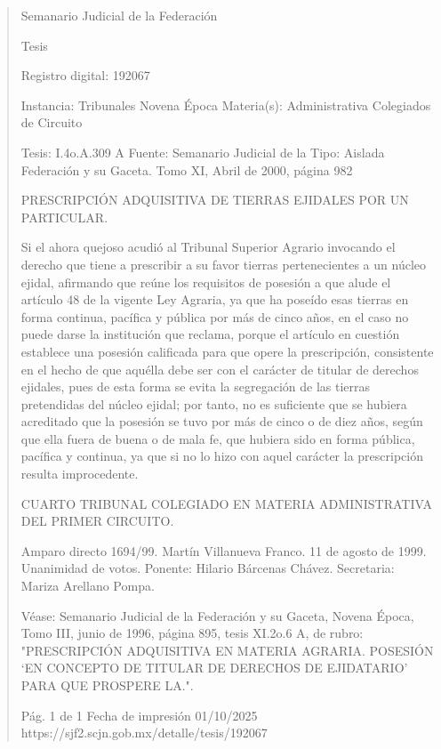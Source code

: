 \documentclass[11pt,a4paper]{article}
\begin{document}
\begin{quote}
                                                   Semanario Judicial de la Federación

                                                  Tesis

 Registro digital: 192067

 Instancia: Tribunales            Novena Época                          Materia(s): Administrativa
 Colegiados de Circuito

 Tesis: I.4o.A.309 A              Fuente: Semanario Judicial de la   Tipo: Aislada
                                  Federación y su Gaceta.
                                  Tomo XI, Abril de 2000, página 982


PRESCRIPCIÓN ADQUISITIVA DE TIERRAS EJIDALES POR UN PARTICULAR.


Si el ahora quejoso acudió al Tribunal Superior Agrario invocando el derecho que tiene a prescribir a
su favor tierras pertenecientes a un núcleo ejidal, afirmando que reúne los requisitos de posesión a
que alude el artículo 48 de la vigente Ley Agraria, ya que ha poseído esas tierras en forma continua,
pacífica y pública por más de cinco años, en el caso no puede darse la institución que reclama,
porque el artículo en cuestión establece una posesión calificada para que opere la prescripción,
consistente en el hecho de que aquélla debe ser con el carácter de titular de derechos ejidales,
pues de esta forma se evita la segregación de las tierras pretendidas del núcleo ejidal; por tanto, no
es suficiente que se hubiera acreditado que la posesión se tuvo por más de cinco o de diez años,
según que ella fuera de buena o de mala fe, que hubiera sido en forma pública, pacífica y continua,
ya que si no lo hizo con aquel carácter la prescripción resulta improcedente.

CUARTO TRIBUNAL COLEGIADO EN MATERIA ADMINISTRATIVA DEL PRIMER CIRCUITO.


Amparo directo 1694/99. Martín Villanueva Franco. 11 de agosto de 1999. Unanimidad de votos.
Ponente: Hilario Bárcenas Chávez. Secretaria: Mariza Arellano Pompa.

Véase: Semanario Judicial de la Federación y su Gaceta, Novena Época, Tomo III, junio de 1996,
página 895, tesis XI.2o.6 A, de rubro: "PRESCRIPCIÓN ADQUISITIVA EN MATERIA AGRARIA.
POSESIÓN ‘EN CONCEPTO DE TITULAR DE DERECHOS DE EJIDATARIO’ PARA QUE
PROSPERE LA.".




                                             Pág. 1 de 1             Fecha de impresión 01/10/2025
  https://sjf2.scjn.gob.mx/detalle/tesis/192067

\end{quote}
\end{document}
